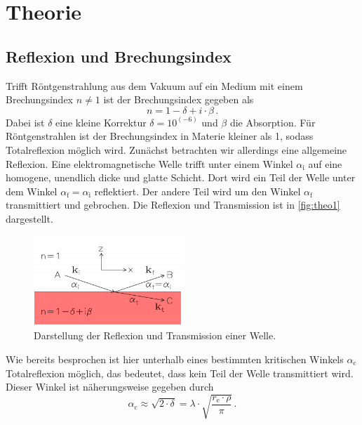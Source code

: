 \section{Theorie}
\label{sec:Theorie}

\subsection{Reflexion und Brechungsindex}
\label{theo1}

Trifft Röntgenstrahlung aus dem Vakuum auf ein Medium mit einem Brechungsindex $n \neq 1$ ist der Brechungsindex gegeben als
\begin{equation}
    n = 1 −  \delta + i \cdot \beta \,.
    \label{eq:index}
\end{equation}
Dabei ist $\delta$ eine kleine Korrektur $\delta = 10^{(-6)}$ und $\beta$ die Absorption.
Für Röntgenstrahlen ist der Brechungsindex in Materie kleiner als 1, sodass Totalreflexion möglich wird.
Zunächst betrachten wir allerdings eine allgemeine Reflexion.
Eine elektromagnetische Welle trifft unter einem Winkel $\alpha_\text{i}$ auf eine homogene, unendlich dicke und glatte Schicht.
Dort wird ein Teil der Welle unter dem Winkel $\alpha _\text{f} = \alpha _\text{i}$ reflektiert.
Der andere Teil wird um den Winkel $\alpha _\text{f}$ transmittiert und gebrochen.
Die Reflexion und Transmission ist in \autoref{fig:theo1} dargestellt.

\begin{figure}
    \centering
    \includegraphics[width=0.5\textwidth]{images/reflektion.png}
    \caption{Darstellung der Reflexion und Transmission einer Welle. \cite{V44old}}
    \label{fig:theo1}
\end{figure}

Wie bereits besprochen ist hier unterhalb eines bestimmten kritischen Winkels $\alpha _\text{c}$ Totalreflexion möglich, das bedeutet, dass kein Teil der Welle transmittiert wird.
Dieser Winkel ist näherungsweise gegeben durch
\begin{equation}
    \alpha _\text{c} \approx \sqrt{2 \cdot \delta} = \lambda  \cdot \sqrt{\frac{r_\text{e} \cdot \rho}{\pi}} \, .
\end{equation}

